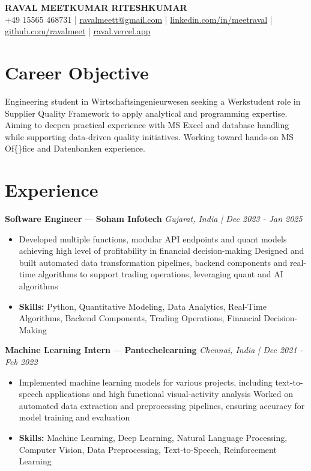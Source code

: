 \documentclass[a4paper,10pt]{article}
\begin{document}
\begin{center}
  {\Large\bfseries RAVAL MEETKUMAR RITESHKUMAR}\\[2pt]
  {\small +49 15565 468731 \;|\; \href{mailto:ravalmeett@gmail.com}{ravalmeett@gmail.com} \;|\; \href{https://www.linkedin.com/in/meetraval/}{linkedin.com/in/meetraval} \;|\; \href{https://github.com/ravalmeet}{github.com/ravalmeet} \;|\; \href{https://raval.vercel.app/}{raval.vercel.app}}
\end{center}
\vspace{-3pt}

\section*{Career Objective}
Engineering student in Wirtschaftsingenieurwesen seeking a Werkstudent role in Supplier Quality Framework to apply analytical and programming expertise. Aiming to deepen practical experience with MS Excel and database handling while supporting data-driven quality initiatives. Working toward hands-on MS Of\{\}fice and Datenbanken experience.\par

\section*{Experience}
\textbf{Software Engineer} — \textbf{Soham Infotech} \hfill \textit{Gujarat, India \;|\; Dec 2023 - Jan 2025}\par
\vspace{1pt}
\begin{itemize}
  \item Developed multiple functions, modular API endpoints and quant models achieving high level of profitability in financial decision-making Designed and built automated data transformation pipelines, backend components and real-time algorithms to support trading operations, leveraging quant and AI algorithms
  \item \textbf{Skills:} Python, Quantitative Modeling, Data Analytics, Real-Time Algorithms, Backend Components, Trading Operations, Financial Decision-Making
\end{itemize}
\vspace{3pt}
\textbf{Machine Learning Intern} — \textbf{Pantechelearning} \hfill \textit{Chennai, India \;|\; Dec 2021 - Feb 2022}\par
\vspace{1pt}
\begin{itemize}
  \item Implemented machine learning models for various projects, including text-to-speech applications and high functional visual-activity analysis Worked on automated data extraction and preprocessing pipelines, ensuring accuracy for model training and evaluation
  \item \textbf{Skills:} Machine Learning, Deep Learning, Natural Language Processing, Computer Vision, Data Preprocessing, Text-to-Speech, Reinforcement Learning
\end{itemize}
\end{document}
